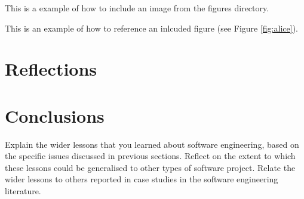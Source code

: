 \documentclass{l3proj}
\begin{document}
This is a example of how to include an image from the figures directory.



This is an example of how to reference an inlcuded figure (see Figure \ref{fig:alice}).

\section{Reflections}
\label{sec:reflections}


\section{Conclusions}
\label{sec:conclusions}

Explain the wider lessons that you learned about software engineering,
based on the specific issues discussed in previous sections.  Reflect
on the extent to which these lessons could be generalised to other
types of software project.  Relate the wider lessons to others
reported in case studies in the software engineering literature.



\end{document}

